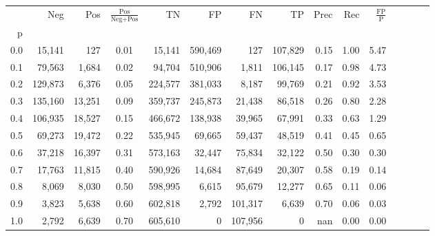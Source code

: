 \begin{tabular}{rrrcrrrrrrrrrrr}
\toprule
{} &      Neg &     Pos & $\frac{\text{Pos}}{\text{Neg}+\text{Pos}}$ &       TN &       FP &       FN &       TP &  Prec &   Rec & $\frac{\text{FP}}{\text{P}}$ \\
p   &          &         &                                            &          &          &          &          &       &       &                              \\
\midrule
0.0 &   15,141 &     127 &                                       0.01 &   15,141 &  590,469 &      127 &  107,829 &  0.15 &  1.00 &                         5.47 \\
0.1 &   79,563 &   1,684 &                                       0.02 &   94,704 &  510,906 &    1,811 &  106,145 &  0.17 &  0.98 &                         4.73 \\
0.2 &  129,873 &   6,376 &                                       0.05 &  224,577 &  381,033 &    8,187 &   99,769 &  0.21 &  0.92 &                         3.53 \\
0.3 &  135,160 &  13,251 &                                       0.09 &  359,737 &  245,873 &   21,438 &   86,518 &  0.26 &  0.80 &                         2.28 \\
0.4 &  106,935 &  18,527 &                                       0.15 &  466,672 &  138,938 &   39,965 &   67,991 &  0.33 &  0.63 &                         1.29 \\
0.5 &   69,273 &  19,472 &                                       0.22 &  535,945 &   69,665 &   59,437 &   48,519 &  0.41 &  0.45 &                         0.65 \\
0.6 &   37,218 &  16,397 &                                       0.31 &  573,163 &   32,447 &   75,834 &   32,122 &  0.50 &  0.30 &                         0.30 \\
0.7 &   17,763 &  11,815 &                                       0.40 &  590,926 &   14,684 &   87,649 &   20,307 &  0.58 &  0.19 &                         0.14 \\
0.8 &    8,069 &   8,030 &                                       0.50 &  598,995 &    6,615 &   95,679 &   12,277 &  0.65 &  0.11 &                         0.06 \\
0.9 &    3,823 &   5,638 &                                       0.60 &  602,818 &    2,792 &  101,317 &    6,639 &  0.70 &  0.06 &                         0.03 \\
1.0 &    2,792 &   6,639 &                                       0.70 &  605,610 &        0 &  107,956 &        0 &   nan &  0.00 &                         0.00 \\
\bottomrule
\end{tabular}
